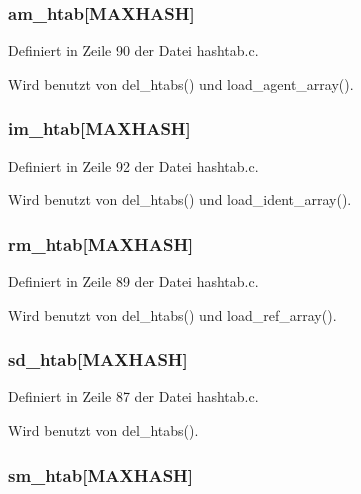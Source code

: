 \subsubsection{ {\bf am\_\-htab}[MAXHASH]}\label{hashtab_8h_4886dbd661ad553906dc83e1a8031316}




Definiert in Zeile 90 der Datei hashtab.c.

Wird benutzt von del\_\-htabs() und load\_\-agent\_\-array().
\subsubsection{ {\bf im\_\-htab}[MAXHASH]}\label{hashtab_8h_1a7bfe1ecf3b78722bcee9d08e8178a1}




Definiert in Zeile 92 der Datei hashtab.c.

Wird benutzt von del\_\-htabs() und load\_\-ident\_\-array().
\subsubsection{ {\bf rm\_\-htab}[MAXHASH]}\label{hashtab_8h_4b36877a2219872c641eb9a58ae45ce8}




Definiert in Zeile 89 der Datei hashtab.c.

Wird benutzt von del\_\-htabs() und load\_\-ref\_\-array().
\subsubsection{ {\bf sd\_\-htab}[MAXHASH]}\label{hashtab_8h_e5ddad8435a9d403e79f4bd320fea151}




Definiert in Zeile 87 der Datei hashtab.c.

Wird benutzt von del\_\-htabs().
\subsubsection{ {\bf sm\_\-htab}[MAXHASH]}\label{hashtab_8h_408742678920fdb90b2926c215e8e19c}




